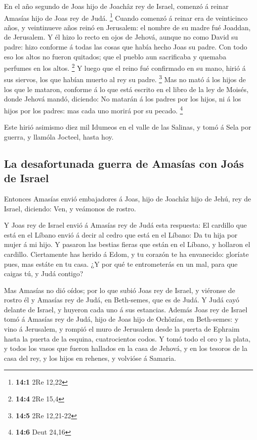  En el año segundo de Joas hijo de Joachâz rey de Israel,
comenzó á reinar Amasías hijo de Joas rey de Judá. \footnote{\textbf{14:1}
  2Re 12,22}  Cuando comenzó á reinar era de veinticinco
años, y veintinueve años reinó en Jerusalem: el nombre de su madre fué
Joaddan, de Jerusalem.  Y él hizo lo recto en ojos de
Jehová, aunque no como David su padre: hizo conforme á todas las cosas
que había hecho Joas su padre.  Con todo eso los altos no
fueron quitados; que el pueblo aun sacrificaba y quemaba perfumes en los
altos. \footnote{\textbf{14:4} 2Re 15,4}  Y luego que el
reino fué confirmado en su mano, hirió á sus siervos, los que habían
muerto al rey su padre. \footnote{\textbf{14:5} 2Re 12,21-22}
 Mas no mató á los hijos de los que le mataron, conforme á
lo que está escrito en el libro de la ley de Moisés, donde Jehová mandó,
diciendo: No matarán á los padres por los hijos, ni á los hijos por los
padres: mas cada uno morirá por su pecado. \footnote{\textbf{14:6} Deut
  24,16}

 Este hirió asimismo diez mil Idumeos en el valle de las
Salinas, y tomó á Sela por guerra, y llamóla Jocteel, hasta hoy.

\hypertarget{la-desafortunada-guerra-de-amasuxedas-con-jouxe1s-de-israel}{%
\subsection{La desafortunada guerra de Amasías con Joás de
Israel}\label{la-desafortunada-guerra-de-amasuxedas-con-jouxe1s-de-israel}}

 Entonces Amasías envió embajadores á Joas, hijo de Joachâz
hijo de Jehú, rey de Israel, diciendo: Ven, y veámonos de rostro.

 Y Joas rey de Israel envió á Amasías rey de Judá esta
respuesta: El cardillo que está en el Líbano envió á decir al cedro que
está en el Líbano: Da tu hija por mujer á mi hijo. Y pasaron las bestias
fieras que están en el Líbano, y hollaron el cardillo. 
Ciertamente has herido á Edom, y tu corazón te ha envanecido: gloríate
pues, mas estáte en tu casa. ¿Y por qué te entrometerás en un mal, para
que caigas tú, y Judá contigo?

 Mas Amasías no dió oídos; por lo que subió Joas rey de
Israel, y viéronse de rostro él y Amasías rey de Judá, en Beth-semes,
que es de Judá.  Y Judá cayó delante de Israel, y huyeron
cada uno á sus estancias.  Además Joas rey de Israel tomó á
Amasías rey de Judá, hijo de Joas hijo de Ochôzías, en Beth-semes: y
vino á Jerusalem, y rompió el muro de Jerusalem desde la puerta de
Ephraim hasta la puerta de la esquina, cuatrocientos codos.
 Y tomó todo el oro y la plata, y todos los vasos que
fueron hallados en la casa de Jehová, y en los tesoros de la casa del
rey, y los hijos en rehenes, y volvióse á Samaria.

